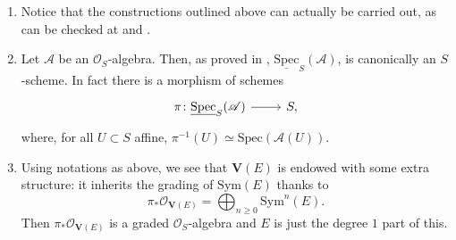 \begin{rem}[]\leavevmode\vspace{-.2\baselineskip}
\begin{enumerate}
	\item Notice that the constructions outlined above can actually be carried out,
		as can be checked at 
		\cite[\href{https://stacks.math.columbia.edu/tag/01LL}{Section 01LL}]{SP}
		and
		\cite[\href{https://stacks.math.columbia.edu/tag/01M1}{Section 01M1}]{SP}.

	\item Let $\mathscr{A}$ be an $\mathcal{O}_{ S }$-algebra. 
		Then, as proved in 
		\cite[\href{https://stacks.math.columbia.edu/tag/01LP}{Lemma 01LP}]{SP},
		$\underline{\mathrm{Spec}}_S(\mathscr{A})$, is canonically an $S$-scheme.
		In fact there is a morphism of schemes
		\begin{equation*}
		\begin{tikzcd}[row sep = 0ex
			,/tikz/column 1/.append style={anchor=base east}
			,/tikz/column 2/.append style={anchor=base west}]
			\pi\colon \underline{\mathrm{Spec}}_S(\mathscr{A})
			\arrow[r, "", rightarrow] &
			S
		,\end{tikzcd}
		\end{equation*} 
		where, for all $U \subset S$ affine, $\pi^{-1}(U) \simeq \mathrm{Spec}(\mathscr{A}(U))$.

	\item Using notations as above, we see that $\mathbf{V}(E)$ is endowed with
		some extra structure: it inherits the grading of $\mathrm{Sym}(E)$
		thanks to
		\begin{equation*}
			\pi_* \mathcal{O}_{ \mathbf{V}(E) } =
			\bigoplus_{n \geq 0} \mathrm{Sym}^n(E)
		.\end{equation*}
		Then $\pi_* \mathcal{O}_{ \mathbf{V}(E) }$ is a graded
		$\mathcal{O}_{ S }$-algebra and $E$ is just the degree $1$ part
		of this.
\end{enumerate}
\end{rem}


